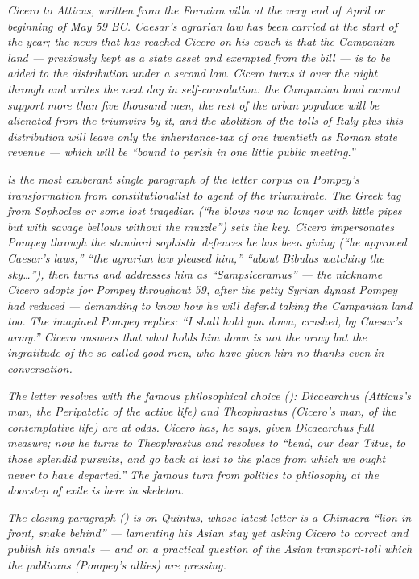 
\textit{Cicero to Atticus, written from the Formian villa
at the very end of April or beginning of May 59 BC. Caesar's
agrarian law has been carried at the start of the year; the
news that has reached Cicero on his couch is that the
Campanian land --- previously kept as a state asset and
exempted from the bill --- is to be added to the distribution
under a second law. Cicero turns it over the night through
and writes  the next day in self-consolation:
the Campanian land cannot support more than five thousand
men, the rest of the urban populace will be alienated from
the triumvirs by it, and the abolition of the tolls of Italy
plus this distribution will leave only the inheritance-tax
of one twentieth as Roman state revenue --- which will be
``bound to perish in one little public meeting.''}

\textit{ is the most exuberant single
paragraph of the letter corpus on Pompey's transformation
from constitutionalist to agent of the triumvirate. The
Greek tag from Sophocles or some lost tragedian (``he blows
now no longer with little pipes but with savage bellows
without the muzzle'') sets the key. Cicero impersonates
Pompey through the standard sophistic defences he has been
giving (``he approved Caesar's laws,'' ``the agrarian law
pleased him,'' ``about Bibulus watching the sky\ldots''),
then turns and addresses him as ``Sampsiceramus'' --- the
nickname Cicero adopts for Pompey throughout 59, after the
petty Syrian dynast Pompey had reduced --- demanding to know
how he will defend taking the Campanian land too. The
imagined Pompey replies: ``I shall hold you down, crushed,
by Caesar's army.'' Cicero answers that what holds him down
is not the army but the ingratitude of the so-called good
men, who have given him no thanks even in conversation.}

\textit{The letter resolves with the famous philosophical
choice (): Dicaearchus (Atticus's man, the
Peripatetic of the active life) and Theophrastus (Cicero's
man, of the contemplative life) are at odds. Cicero has,
he says, given Dicaearchus full measure; now he turns to
Theophrastus and resolves to ``bend, our dear Titus, to
those splendid pursuits, and go back at last to the place
from which we ought never to have departed.'' The famous
turn from politics to philosophy at the doorstep of exile
is here in skeleton.}

\textit{The closing paragraph () is on
Quintus, whose latest letter is a Chimaera ``lion in front,
snake behind'' --- lamenting his Asian stay yet asking
Cicero to correct and publish his annals --- and on a
practical question of the Asian transport-toll which the
publicans (Pompey's allies) are pressing.}

